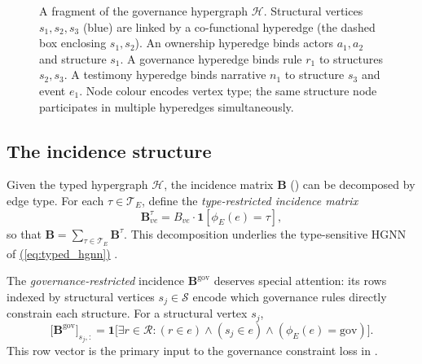 \documentclass[11pt,a4paper]{article}
\renewcommand{\eqref}[1]{%
    \hyperref[#1]{\textcolor{eqred}{(\ref*{#1})}}%
}
\theoremstyle{plain}
\theoremstyle{definition}
\theoremstyle{remark}
\newcommand{\HG}{\mathcal{H}}
\newcommand{\Struc}{\mathcal{S}}
\newcommand{\Act}{\mathcal{A}}
\newcommand{\Nar}{\mathcal{N}}
\newcommand{\Rul}{\mathcal{R}}
\newcommand{\Evt}{\mathcal{V}}
\newcommand{\Te}{\mathcal{T}_E}
\begin{document}
\begin{figure}[t]
\caption{%
  A fragment of the governance hypergraph $\HG$. Structural vertices
  $s_1, s_2, s_3$ (blue) are linked by a co-functional hyperedge
  (the dashed box enclosing $s_1, s_2$). An ownership hyperedge binds
  actors $a_1, a_2$ and structure $s_1$. A governance hyperedge binds
  rule $r_1$ to structures $s_2, s_3$. A testimony hyperedge binds
  narrative $n_1$ to structure $s_3$ and event $e_1$. Node colour
  encodes vertex type; the same structure node participates in
  multiple hyperedges simultaneously.%
}
\label{fig:hypergraph_taxonomy}
\end{figure}

\subsection{The incidence structure}
\label{sec:layer2_incidence}

Given the typed hypergraph $\HG$, the incidence matrix $\mathbf{B}$
() can be decomposed by edge type. For each
$\tau \in \Te$, define the \emph{type-restricted incidence matrix}
\[
  \mathbf{B}^\tau_{ve}
  = B_{ve} \cdot \mathbf{1}[\phi_E(e) = \tau],
\]
so that $\mathbf{B} = \sum_{\tau \in \Te} \mathbf{B}^\tau$.
This decomposition underlies the type-sensitive HGNN
of \eqref{eq:typed_hgnn}.

The \emph{governance-restricted} incidence $\mathbf{B}^{\mathrm{gov}}$
deserves special attention: its rows indexed by structural vertices
$s_j \in \Struc$ encode which governance rules directly constrain
each structure. For a structural vertex $s_j$,
\[
  \bigl[\mathbf{B}^{\mathrm{gov}}\bigr]_{s_j,:}
  = \mathbf{1}\bigl[\exists r \in \Rul :
    (r \in e) \wedge (s_j \in e) \wedge
    (\phi_E(e) = \mathrm{gov})\bigr].
\]
This row vector is the primary input to the governance constraint loss
in .
\end{document}
